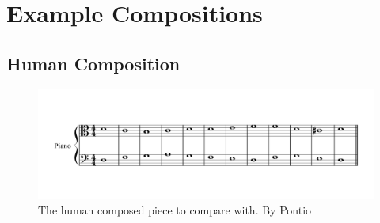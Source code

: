 \section{Example Compositions}

\subsection{Human Composition}
\begin{figure}[h!]
  \includegraphics[width=5in]{example-composition-images/base-1.png}
\caption{The human composed piece to compare with. By Pontio \cite{ModalCounterpoint}}
\end{figure}
\clearpage

